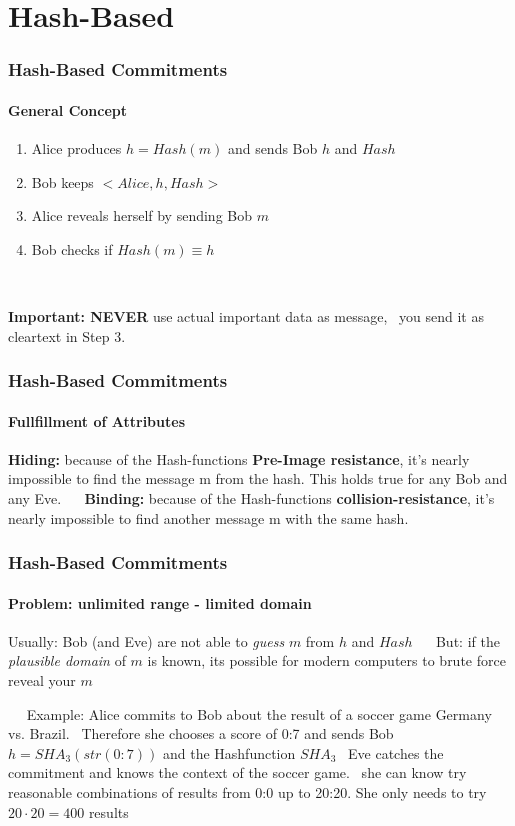\section{Hash-Based}
\begin{frame}
	\frametitle{Hash-Based Commitments}
	\framesubtitle{General Concept}
	\begin{LARGE}
		\begin{enumerate}
			\item Alice produces $h = Hash(m)$ and sends Bob $h$ and $Hash$
			\item Bob keeps $<Alice,h,Hash>$
			\item Alice reveals herself by sending Bob $m$
			\item Bob checks if $Hash(m) \equiv h$
		\end{enumerate}
	\end{LARGE}
	 ~\newline  ~\newline 
	 \begin{center}
	 	\textbf{Important: NEVER} use actual important data as message,  ~\newline  you send it as cleartext in Step 3. 
	 \end{center}
\end{frame}

\begin{frame}
	\frametitle{Hash-Based Commitments}
	\framesubtitle{Fullfillment of Attributes}
	\begin{LARGE}
	\textbf{Hiding:} because of the Hash-functions \textbf{Pre-Image resistance}, it's nearly impossible to find the message m from the hash. This holds true for any Bob and any Eve. ~\newline ~\newline
	\textbf{Binding:} because of the Hash-functions \textbf{collision-resistance}, it's nearly impossible to find another message m with the same hash.
	\end{LARGE}
\end{frame}

\begin{frame}
	\frametitle{Hash-Based Commitments}
	\framesubtitle{Problem: unlimited range - limited domain}
	Usually: Bob (and Eve) are not able to \textit{guess} $m$ from $h$ and $Hash$
	~\newline ~\newline
	But: if the \textit{plausible domain} of $m$ is known, its possible for modern computers to brute force reveal your $m$ 
	
	~\newline ~\newline 
	Example: Alice commits to Bob about the result of a soccer game Germany vs. Brazil. ~\newline Therefore she chooses a score of 0:7 and sends Bob $h = SHA_3(str(0:7))$ and the Hashfunction $SHA_3$ ~\newline Eve catches the commitment and knows the context of the soccer game. ~\newline she can know try reasonable combinations of results from 0:0 up to 20:20. She only needs to try $20 \cdot 20 = 400$ results 
\end{frame}

